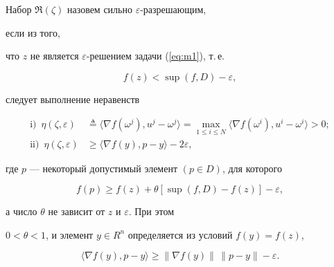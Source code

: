 \begin{defn}


Набор $\Re(\zeta)$ назовем сильно $\varepsilon$-разрешающим,


если из того, 


что $z$ не является $\varepsilon$-решением задачи (\ref{eq:m1}), т.\,е.


\begin{equation}


f(z)< \sup(f,D)-\varepsilon,


\label{eq:m17}


\end{equation}


следует выполнение неравенств


\begin{align}


\text{i)}\ \; \eta(\zeta,\varepsilon )&\triangleq


\langle \nabla f(\omega^{j}),u^{j}-\omega^{j} \rangle =


\max_{1\leq i\leq N}\langle \nabla f(\omega^{i}),u^{i}-\omega^{i} \rangle >0;


\label{eq:m18} \\


\text{ii)}\ \; \eta(\zeta,\varepsilon )&\geq 


\langle \nabla f(y),p-y \rangle - 2\varepsilon,


\label{eq:m19}


\end{align}


где $p$ --- некоторый допустимый элемент $(p \in D)$, для которого


\begin{equation}


f(p)\geq f(z) + \theta [\sup(f,D)-f(z)]-\varepsilon,


\label{eq:m20}


\end{equation}


а число $\theta$ не зависит от $z$ и $\varepsilon$. При этом


$0<\theta <1$, и элемент $y\in R^{n}$ определяется из условий $f(y)=f(z)$,


\begin{equation}


\langle\nabla f(y),p-y\rangle \ge \|\nabla f(y)\|\, \|p-y\|- \varepsilon.


\label{eq:m21}


\end{equation}


\end{defn}





